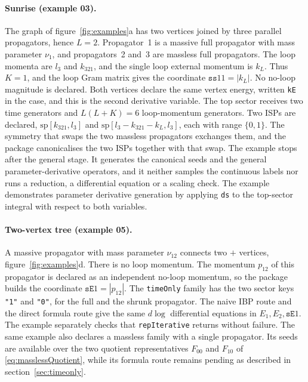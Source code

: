 \documentclass[11pt,a4paper]{article}
\begin{document}
\paragraph{Sunrise (example 03).}
The graph of figure~\ref{fig:examples}a has two vertices joined by three parallel propagators,
hence $L=2$. Propagator~1 is a massive full propagator with mass parameter $\nu_1$, and
propagators~2 and~3
are massless full propagators. The loop
momenta are $l_3$ and $k_{321}$, and the single loop external momentum is $k_L$. Thus $K=1$, and
the loop Gram matrix gives the coordinate $\texttt{ss}11=|k_L|$. No no-loop magnitude is declared.
Both vertices declare the same vertex energy, written \texttt{kE} in the case, and this is the
second derivative variable.
The top sector receives two time generators and $L(L+K)=6$ loop-momentum generators. Two ISPs are
declared, $\mathrm{sp}[k_{321},l_3]$ and $\mathrm{sp}[l_3-k_{321}-k_L,l_3]$, each with range
$\{0,1\}$. The symmetry that swaps the two massless propagators exchanges them, and the package
canonicalises the two ISPs together with that swap. The example stops after the general stage. It
generates the canonical seeds and the general parameter-derivative operators, and it neither
samples the continuous labels nor runs a reduction, a differential equation or a scaling check. The
example demonstrates parameter derivative generation by applying \texttt{ds} to the top-sector
integral with respect to both variables.

\paragraph{Two-vertex tree (example 05).}
A massive propagator with mass parameter $\nu_{12}$ connects two $+$ vertices,
figure~\ref{fig:examples}d.
There is no loop momentum. The momentum $p_{12}$ of this propagator is declared as an independent
no-loop momentum, so the package builds the coordinate $\texttt{sE}1=|p_{12}|$. The
\texttt{timeOnly} family has the two sector keys \texttt{"1"} and \texttt{"0"}, for the full and
the shrunk propagator. The naive IBP route and the direct formula route give the same $d\log$
differential equations in $E_1,E_2,\texttt{sE}1$.
The example separately checks that \texttt{repIterative} returns without failure. The
same example also declares a massless family with a single propagator.
Its seeds are available over the two quotient representatives $F_{00}$ and $F_{10}$ of
\eqref{eq:masslessQuotient}, while its formula route remains pending as described in
section~\ref{sec:timeonly}.
\end{document}
